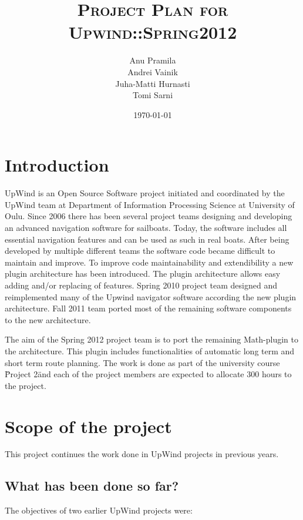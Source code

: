\documentclass[12pt,titlepage,a4paper]{article}
\date{\today}
\title{\textsc{Project Plan for Upwind::Spring2012}}
\author{Anu Pramila\\
		Andrei Vainik\\
		Juha-Matti Hurnasti\\
		Tomi Sarni\\}
\begin{document}
\maketitle
\tableofcontents
\thispagestyle{empty} 

\newpage
\pagestyle{myheadings}
\setcounter{page}{1}
\markright{\hfill}

\section{Introduction}

UpWind is an Open Source Software project initiated and coordinated by the UpWind team at Department of Information Processing Science at University of Oulu. Since 2006 there has been several project teams designing and developing an advanced navigation software for sailboats. Today, the software includes all essential navigation features and can be used as such in real boats. After being developed by multiple different teams the software code became difficult to maintain and improve. To improve code maintainability and extendibility a new plugin architecture has been introduced. The plugin architecture allows easy adding and/or replacing of features. Spring 2010 project team designed and reimplemented many of the Upwind navigator software according the new plugin architecture. Fall 2011 team ported most of the remaining software components to the new architecture.
	
The aim of the Spring 2012 project team is to port the remaining Math-plugin to the architecture. This plugin includes functionalities of automatic long term and short term route planning. The work is done as part of the university course \"Project 2\" and each of the project members are expected to allocate 300 hours to the project.

\section{Scope of the project}
 
 	This project continues the work done in UpWind projects in previous years.
 	
	\subsection{What has been done so far?}
 
		The objectives of two earlier UpWind projects were:
\end{document}

